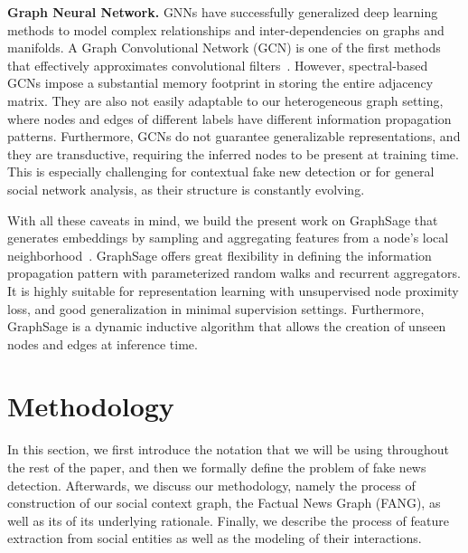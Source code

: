 \documentclass[sigconf,anonymous]{acmart}
\theoremstyle{definition}
\theoremstyle{hypothesis}
\begin{document}
\noindent\textbf{Graph Neural Network.}
GNNs have successfully generalized deep learning methods to model complex relationships and inter-dependencies on graphs and manifolds. A Graph Convolutional Network (GCN) is one of the first methods that effectively approximates convolutional filters~\cite{kipf2016semi}. However, spectral-based GCNs impose a substantial memory footprint in storing the entire adjacency matrix.  They are also not easily adaptable to our heterogeneous graph setting, where nodes and edges of different labels have different information propagation patterns. Furthermore, GCNs do not guarantee  generalizable representations, and they are transductive, requiring the inferred nodes to be present at training time. This is especially challenging for contextual fake new detection or for general social network analysis, as their structure is constantly evolving. 

With all these caveats in mind, we build the present work on GraphSage that generates embeddings by sampling and aggregating features from a node's local neighborhood~\cite{Hamilton2017InductiveRL}. GraphSage offers great flexibility in defining the information propagation pattern with parameterized random walks and recurrent aggregators. It is highly suitable for representation learning with unsupervised node proximity loss, and
good generalization in minimal supervision settings. Furthermore, GraphSage is a dynamic inductive algorithm that allows the creation of unseen nodes and edges at inference time.

\section{Methodology}

In this section, we first introduce the notation that we will be using throughout the rest of the paper, and then we formally define the problem of fake news detection. Afterwards, we discuss our methodology, namely the process of construction of our social context graph, the Factual News Graph (FANG), as well as its of its
underlying rationale. 
Finally, we describe the process of feature extraction from social entities as well as the modeling of their interactions. 
\end{document}
